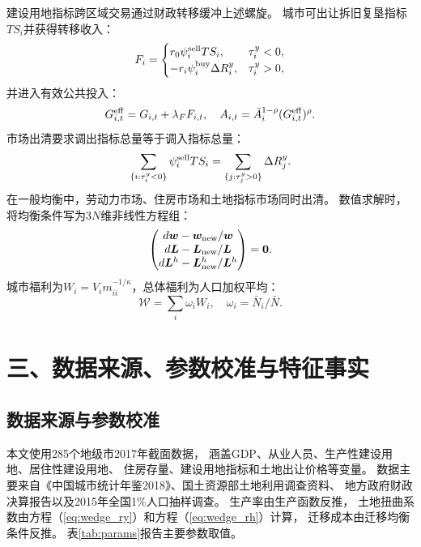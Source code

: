 \documentclass[UTF8,a4paper,12pt]{ctexart}
\theoremstyle{plain}
\theoremstyle{definition}
\theoremstyle{remark}
\newcommand{\Ry}{R^{y}}
\newcommand{\tauy}{\tau^{y}}
\begin{document}
建设用地指标跨区域交易通过财政转移缓冲上述螺旋。
城市可出让拆旧复垦指标$TS_i$并获得转移收入：
\begin{equation}
  F_i=\begin{cases}
    r_0\psi_i^{\rm sell}TS_i, & \tauy_i<0,\\
    -r_i\psi_i^{\rm buy}\Delta\Ry_i, & \tauy_i>0,
  \end{cases}
  \label{eq:transfer}
\end{equation}
并进入有效公共投入：
\begin{equation}
  G_{i,t}^{\rm eff}=G_{i,t}+\lambda_FF_{i,t},
  \quad A_{i,t}=\bar{A}_i^{1-\rho}(G_{i,t}^{\rm eff})^\rho.
  \label{eq:G_transfer}
\end{equation}
市场出清要求调出指标总量等于调入指标总量：
\begin{equation}
  \sum_{\{i:\tauy_i<0\}}\psi_i^{\rm sell}TS_i
  =\sum_{\{j:\tauy_j>0\}}\Delta\Ry_j.
  \label{eq:land_clearing}
\end{equation}
在一般均衡中，劳动力市场、住房市场和土地指标市场同时出清。
数值求解时，将均衡条件写为$3N$维非线性方程组：
\begin{equation}
  \begin{pmatrix}
    d\bm{w}-\bm{w}_{\rm new}/\bm{w}\\
    d\bm{L}-\bm{L}_{\rm new}/\bm{L}\\
    d\bm{L}^h-\bm{L}_{\rm new}^h/\bm{L}^h
  \end{pmatrix}=\bm{0}.
  \label{eq:equilibrium}
\end{equation}
城市福利为$W_i=V_i m_{ii}^{-1/\kappa}$，总体福利为人口加权平均：
\begin{equation}
  \mathcal{W}=\sum_i\omega_iW_i, \quad \omega_i=\bar{N}_i/\bar{N}.
  \label{eq:city_welfare}
\end{equation}

\section{三、数据来源、参数校准与特征事实}

\subsection{数据来源与参数校准}

本文使用285个地级市2017年截面数据，
涵盖GDP、从业人员、生产性建设用地、居住性建设用地、
住房存量、建设用地指标和土地出让价格等变量。
数据主要来自《中国城市统计年鉴2018》、国土资源部土地利用调查资料、
地方政府财政决算报告以及2015年全国1\%人口抽样调查。
生产率由生产函数反推，
土地扭曲系数由方程（\ref{eq:wedge_ry}）和方程（\ref{eq:wedge_rh}）计算，
迁移成本由迁移均衡条件反推。
表\ref{tab:params}报告主要参数取值。
\end{document}
